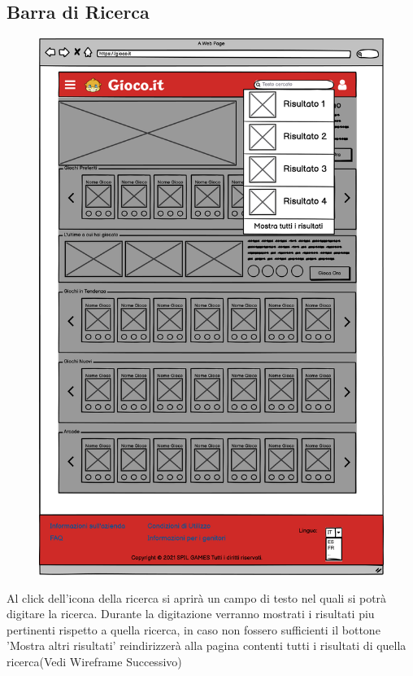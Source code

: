 \documentclass[../Report.tex]{subfiles}
\begin{document}
    \subsection{Barra di Ricerca}
    \begin{figure}[H]
        \includegraphics[width=\linewidth]{WSearchBar.png}
        \centering
    \end{figure}
    
    Al click dell'icona della ricerca si aprirà un campo di testo nel quali si potrà digitare la ricerca.
    Durante la digitazione verranno mostrati i risultati piu pertinenti rispetto a quella ricerca, in caso non fossero sufficienti il bottone 'Mostra altri risultati' reindirizzerà alla pagina contenti tutti i risultati di quella ricerca(Vedi Wireframe Successivo)
\end{document}

